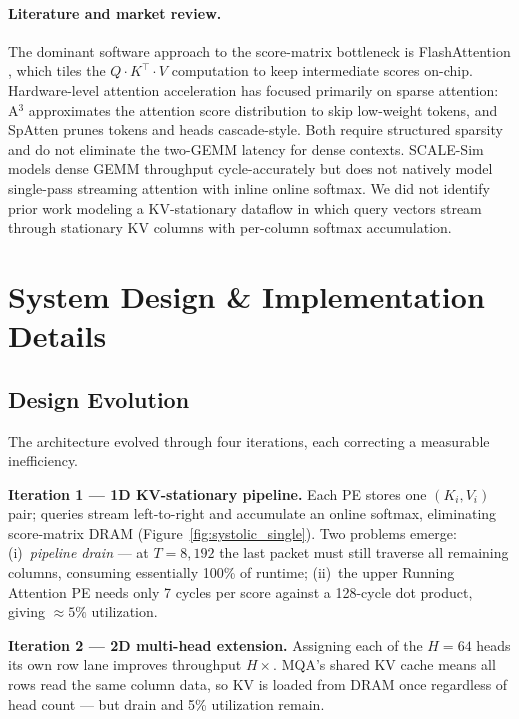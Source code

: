 \documentclass[11pt]{article}
\begin{document}
\paragraph{Literature and market review.}
The dominant software approach to the score-matrix bottleneck is
FlashAttention \parencite{dao2022flashattention}, which tiles the
$Q\!\cdot\!K^\top\!\cdot\!V$ computation to keep intermediate scores on-chip.
Hardware-level attention acceleration has focused primarily on sparse attention:
A$^3$ \parencite{ham2020a3} approximates the attention score distribution to skip
low-weight tokens, and SpAtten \parencite{wang2021spatten} prunes tokens and heads
cascade-style.
Both require structured sparsity and do not eliminate the two-GEMM latency
for dense contexts.
SCALE-Sim \parencite{samajdar2020systematic} models dense GEMM throughput
cycle-accurately but does not natively model single-pass streaming attention
with inline online softmax.
We did not identify prior work modeling a KV-stationary dataflow in which query
vectors stream through stationary KV columns with per-column softmax accumulation.

\section{System Design \& Implementation Details}

\subsection{Design Evolution}

The architecture evolved through four iterations, each correcting a measurable
inefficiency.

\textbf{Iteration 1 --- 1D KV-stationary pipeline.}
Each PE stores one $(K_i, V_i)$ pair; queries stream left-to-right and accumulate
an online softmax, eliminating score-matrix DRAM
(Figure~\ref{fig:systolic_single}).
Two problems emerge: (i)~\emph{pipeline drain} --- at $T{=}8{,}192$ the last
packet must still traverse all remaining columns, consuming essentially 100\% of
runtime; (ii)~the upper Running Attention PE needs only 7 cycles per score
against a 128-cycle dot product, giving $\approx\!5\%$ utilization.

\textbf{Iteration 2 --- 2D multi-head extension.}
Assigning each of the $H{=}64$ heads its own row lane improves throughput $H\times$.
MQA's shared KV cache means all rows read the same column data, so KV is loaded
from DRAM once regardless of head count --- but drain and 5\% utilization remain.
\end{document}
